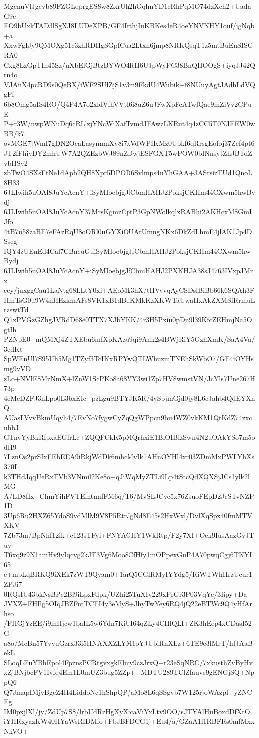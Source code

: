 MgcnuVlJgevb89FZGLqprgES8w8ZxrUh2hGqhnYD1eRhPqMO74dzXch2+UadaG9c
EO9bUxkTAD3lSgXJ8LUDeXPB/GF4ItthjIuKBKes4eR4oeYNVNHY1ouf/igNqb+a
XxwFgIJy9QMOXg51c3zhRDHgSGpfCua2Ltxn6jmp8NRKQsqT1z5mtBuEnSISCRA0
Cxg8LzGpTIh45Sz/uXbElGjBtzBYWO4RH6UJpWyPC38BnQHOOgS+iyqJJ42Qrn4o
VJAnX4pcRD9s0QeBX/iWF2SUlZjS1v3m9FkdU4Wubik+f8NUuyAgtJAdhLdVQgFf
6b8Omg5aIS4RO/Q4P4A7o2xldVfhVVtI6i8uZ6uJFwXpFcATwfQae9mZiVv2CPuE
P+r3W/nwpWNuDq6cRLlzjYNcWiXafTvmdJFAwzLKRut4q4zCC5T0NJEEW0wBB/k7
ovMGE7jWmI7gDN2OcaLasynnmXv8i7xVdWPIKMz0Upkf6qRrsgEofoj37Zef4pt6
JT2fFhiyDY2mhUW7A2QZEzbWJ89nZDwjESFGXT5wPOW0bINnsytZhJBTdZvbHSy2
zbTwO4SXsFtNe1dApb2QH8Xpr5DPOD6Svlmps4uYhGAA+3ASrsizTUd1QnoL8H33
6JLIwih5uOAl8JuYcAcnY+iSyMIoebjgJfCbmHAHJ2PoksjCKHm44CXwm5hwBydj
6JLIwih5uOAl8JuYcAcnY37MrsKgmzCptP3GpNWolkqlxRABhi2AKHcxM8GmIJfo
4tB7u58zaBE7eFAzRqU8oORl0uGYXiOUArUmngNKx6DkZdLhmF4jlAK1Jp4DSseg
IQY4zUEnEd4Cal7CBncuGuiSyMIoebjgJfCbmHAHJ2PoksjCKHm44CXwm5hwBydj
6JLIwih5uOAl8JuYcAcnY+iSyMIoebjgJfCbmHAHJ2PXKHJA38sJ4763IVxpJMrx
ecy/juxggCau1LaNtg68LLtY0xi+AEoMk3hX/tHVvvqAyCSDslBiBb66k6SQAh3F
HmTsG0u9W4nIIEzkmAFs8VK1xB1dBdKMkKzXKWTaUwaHxAkZXMSfRrmuLrzswtTd
Q1xPVGzGZhgJVRdD68e0TTX7XJbYKK/4r3H5Pxiu0pDn9l39KfcZEHmjNa5OgtIh
PZNpE0+mQMXj4ZTXEbu6mfXpKAzu9qi9Ank2s4BWjRiY5GzhXmK/SaA4Va/3edKt
SpWEnUl7S95Uh5Mg1TZyf3TcIKxRPYwQTLWhuzmTNEhSkWbO7/GE4iOYHsmg9vVD
zLo+NVlE8MzNmX+lZnW1ScPKo8a68VY3wi1Zp7HV8wmstVN/JcYls7Une267H73p
4eMeDZFJ3nLpo0L3bxEIc+pzLgu9BTYJK5R/4vSpjmGjd0jy8L6cJahb4QdEYXnQ
AUasLVvvBkmUqyh4/7EvNo7fygwCyZqQgWPpcn9bu4WZ0vkKM1QtKdZ74zxcuhbJ
GTnvYyBkRfpxaEGfrLc+ZQQFCkK5pMQrhxiE1BlOIBlzSwn4N2uOAkYSo7m5odH9
7LznOs2prSIxFEbEEA9iRkjWdDk6mhcMvIk1AHnOYHl4xr03ZDmMxPWLYhXs370L
k3THdJqqUeRxTVb3VNmil2Ke8o+qJiWqMyZTLi9Lp4tStcQdXQXSjJCs1ylk2lMG
A/LD8fIx+ChmYihFVTEintnnfFM6q/T6/MvSLJCye5x76ZsuoFEpD2JcSTvNZP1D
3Up6Ru2HXZ65YdoS9vdMlM9V8P5RtrJgNd8E45s2HxWxl/DvlXqSpx40fmMTVXKV
7Zb73m/BpNhf12ik+c123sTFyi+FNYAGHY1WkRtp/F2y7XI+Oek9IusAazGvJTuy
T6xq9z9N1amHv9yIqcvg2kJT3Vg6Moo8CfHfy1mOPpexGuP4A70pwqCgj6TKYI65
e+mbLqBRKQ9iXEk7zWT9Qyam0+1arQ5CGlRMyIYYdg5/RiWTWhIIrzUcur1ZPJi7
0RQsIU43bkNsBPc2Bi9iLpxFdpk/UZhi25TuXIv229xPrGr3P03VqYe/3Iipy+Da
JVXZ+FHIlg5OIqJBZFntTCEI4y3eMyS+JhyTwYey6RQ4jQ22eBTWc9Q4yHfArhso
/FHGjYzEE/i9mHjcw1baIL5w6Ydn7KiUI64qZLy4CHlQLI+ZK3hEep4xCDasI52G
a8o/McBn57YvvuGzrx33i5HNAXXZLYM1oYJUbiRnXLz+6TE9e3lMrT/hfJAaBekL
SLoqLEuYBhEpol4FpznsPCRtgvxgkElmy9czJrxQ+r23eSqNRC/7xkusthZvByHv
xZjBNjbcFV1Ivfq4Em1L0mUZ3bug5ZZp++MDTU289TClZfauvs9gENGjSQ+NppQ6
Q7JmapIMjvBgcZ4H4LiddoNc1hShpQP/aMo8L6qSSgvb7W125rjoWAzpf+yZNCEg
IM0pxjlXl/jy/ZdUp7S8/lrbUdRzHgXyXfcaViYxLtv9OO/sJTYAlHuBoxdDfXtO
iYHRxyazKW40HYaWsRIDMfo+FbJBPDCG1j+Eu4/a/GZaA1l1RBFRs0mfMxxNkVO+
